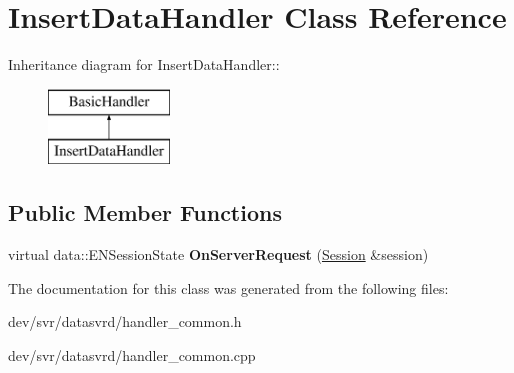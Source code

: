 \hypertarget{classInsertDataHandler}{
\section{InsertDataHandler Class Reference}
\label{classInsertDataHandler}
}
Inheritance diagram for InsertDataHandler::\begin{figure}[H]
\begin{center}
\leavevmode
\includegraphics[height=2cm]{classInsertDataHandler}
\end{center}
\end{figure}
\subsection*{Public Member Functions}
\begin{DoxyCompactItemize}
\item 
\hypertarget{classInsertDataHandler_a5a8ec18efb9e5e7f6d967820bf5e8f05}{
virtual data::ENSessionState {\bfseries OnServerRequest} (\hyperlink{classSession}{Session} \&session)}
\label{classInsertDataHandler_a5a8ec18efb9e5e7f6d967820bf5e8f05}

\end{DoxyCompactItemize}


The documentation for this class was generated from the following files:\begin{DoxyCompactItemize}
\item 
dev/svr/datasvrd/handler\_\-common.h\item 
dev/svr/datasvrd/handler\_\-common.cpp\end{DoxyCompactItemize}
